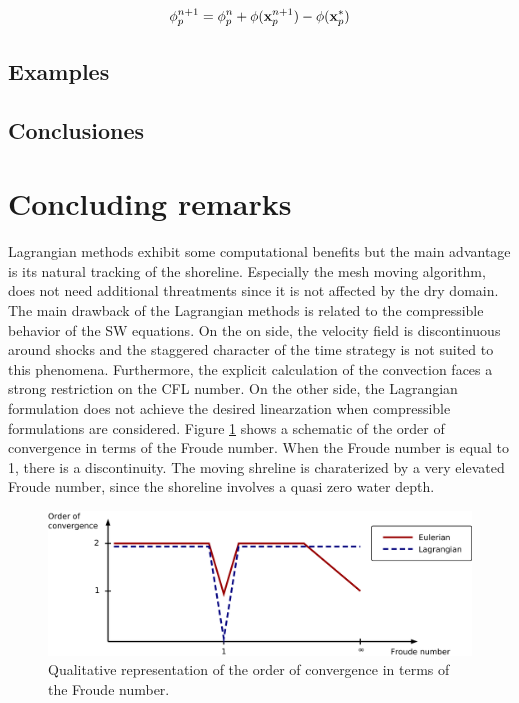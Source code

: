 \begin{equation}
    \phi_p^{n+1} = \phi_p^n + \phi({\bf x}_p^{n+1}) - \phi({\bf x}_p^*)
\end{equation}



\subsection{Examples}


\subsection{Conclusiones}








\section{Concluding remarks}


Lagrangian methods exhibit some computational benefits but the main advantage is its natural tracking of the shoreline. Especially the mesh moving algorithm, does not need additional threatments since it is not affected by the dry domain. The main drawback of the Lagrangian methods is related to the compressible behavior of the SW equations. On the on side, the velocity field is discontinuous around shocks and the staggered character of the time strategy is not suited to this phenomena. Furthermore, the explicit calculation of the convection faces a strong restriction on the CFL number.
On the other side, the Lagrangian formulation does not achieve the desired linearzation when compressible formulations are considered.
Figure \ref{pfem_euler_convergence} shows a schematic of the order of convergence in terms of the Froude number. When the Froude number is equal to 1, there is a discontinuity. The moving shreline is charaterized by a very elevated Froude number, since the shoreline involves a quasi zero water depth.

\begin{figure}
    \centering
    \includegraphics[width=\textwidth]{img/lagrangian/pfem_euler_convergence.png}
    \caption{Qualitative representation of the order of convergence in terms of the Froude number.}
    \label{pfem_euler_convergence}
\end{figure}


